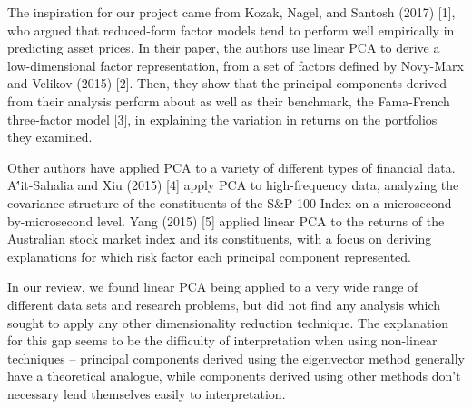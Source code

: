 \documentclass[a4paper]{article}
\begin{document}
   The inspiration for our project came from Kozak, Nagel, and Santosh (2017) [1], who argued that reduced-form factor models tend to perform well empirically in predicting asset prices. In their paper, the authors use linear PCA to derive a low-dimensional factor representation, from a set of factors defined by Novy-Marx and Velikov (2015) [2]. Then, they show that the principal components derived from their analysis perform about as well as their benchmark, the Fama-French three-factor model [3], in explaining the variation in returns on the portfolios they examined. 
   \par Other authors have applied PCA to a variety of different types of financial data. A{\''i}t-Sahalia and Xiu (2015) [4] apply PCA to high-frequency data, analyzing the covariance structure of the constituents of the S\&P 100 Index on a microsecond-by-microsecond level. Yang (2015) [5] applied linear PCA to the returns of the Australian stock market index and its constituents, with a focus on deriving explanations for which risk factor each principal component represented.
   \par In our review, we found linear PCA being applied to a very wide range of different data sets and research problems, but did not find any analysis which sought to apply any other dimensionality reduction technique. The explanation for this gap seems to be the difficulty of interpretation when using non-linear techniques -- principal components derived using the eigenvector method generally have a theoretical analogue, while components derived using other methods don't necessary lend themselves easily to interpretation.
   
\end{document}
